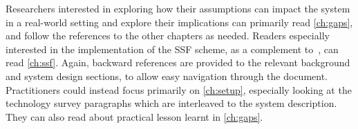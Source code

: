 Researchers interested in exploring how their assumptions 
can impact the system in a real-world setting and explore 
their implications can primarily read \cref{ch:gaps}, 
and follow the references to the other chapters as needed.
Readers especially interested in the implementation of the SSF 
scheme, as a complement to~\cite{GKP}, 
can read \cref{ch:ssf}. 
Again, backward references are provided to the 
relevant background and system design sections,
to allow easy navigation through the document.
Practitioners could instead focus primarily on
\cref{ch:setup}, especially looking at the
technology survey paragraphs which are interleaved 
to the system description. 
They can also read about practical 
lesson learnt in \cref{ch:gaps}.
